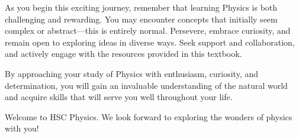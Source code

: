 As you begin this exciting journey, remember that learning Physics is both challenging and rewarding. You may encounter concepts that initially seem complex or abstract—this is entirely normal. Persevere, embrace curiosity, and remain open to exploring ideas in diverse ways. Seek support and collaboration, and actively engage with the resources provided in this textbook.

By approaching your study of Physics with enthusiasm, curiosity, and determination, you will gain an invaluable understanding of the natural world and acquire skills that will serve you well throughout your life.

Welcome to HSC Physics. We look forward to exploring the wonders of physics with you!